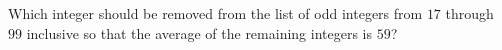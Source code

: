 Which integer should be removed from the list of odd integers from $17$ through $99$ inclusive so that the average of the remaining integers is $59$?
